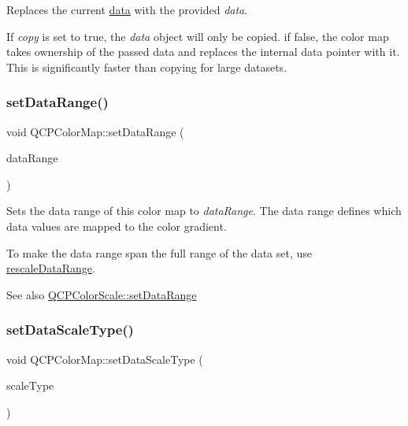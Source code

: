 Replaces the current \hyperlink{class_q_c_p_color_map_a047d7eb3ae657f93f2f39b5e68b79451}{data} with the provided {\itshape data}.

If {\itshape copy} is set to true, the {\itshape data} object will only be copied. if false, the color map takes ownership of the passed data and replaces the internal data pointer with it. This is significantly faster than copying for large datasets. \mbox{\label{class_q_c_p_color_map_a980b42837821159786a85b4b7dcb8774}} 
\subsubsection{\texorpdfstring{set\+Data\+Range()}{setDataRange()}}
{\footnotesize\ttfamily void Q\+C\+P\+Color\+Map\+::set\+Data\+Range (\begin{DoxyParamCaption}\item[{const \hyperlink{class_q_c_p_range}{Q\+C\+P\+Range} \&}]{data\+Range }\end{DoxyParamCaption})}

Sets the data range of this color map to {\itshape data\+Range}. The data range defines which data values are mapped to the color gradient.

To make the data range span the full range of the data set, use \hyperlink{class_q_c_p_color_map_a856608fa3dd1cc290bcd5f29a5575774}{rescale\+Data\+Range}.

\begin{DoxySeeAlso}{See also}
\hyperlink{class_q_c_p_color_scale_abe88633003a26d1e756aa74984587fef}{Q\+C\+P\+Color\+Scale\+::set\+Data\+Range} 
\end{DoxySeeAlso}
\mbox{\label{class_q_c_p_color_map_a9d20aa08e3c1f20f22908c45b9c06511}} 
\subsubsection{\texorpdfstring{set\+Data\+Scale\+Type()}{setDataScaleType()}}
{\footnotesize\ttfamily void Q\+C\+P\+Color\+Map\+::set\+Data\+Scale\+Type (\begin{DoxyParamCaption}\item[{\hyperlink{class_q_c_p_axis_a36d8e8658dbaa179bf2aeb973db2d6f0}{Q\+C\+P\+Axis\+::\+Scale\+Type}}]{scale\+Type }\end{DoxyParamCaption})}

